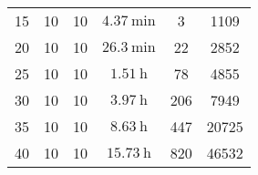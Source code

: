 \documentclass[italian,twoside,twocolumn]{article}
\begin{document}
\begin{table}[htbp]
{\begin{tabular}{c|ccccc}
			15   &      10      &     10     & $ \SI{4.37}{\minute} $ &           3            &    1109     \\
			20   &      10      &     10     & $ \SI{26.3}{\minute} $ &           22           &    2852     \\
			25   &      10      &     10     &  $ \SI{1.51}{\hour} $  &           78           &    4855     \\
			30   &      10      &     10     &  $ \SI{3.97}{\hour} $  &          206           &    7949     \\
			35   &      10      &     10     &  $ \SI{8.63}{\hour} $  &          447           &    20725    \\
			40   &      10      &     10     & $ \SI{15.73}{\hour} $  &          820           &    46532    \\ \hline
		\end{tabular} 
		\label{tab:risultati_xie_kang_10}
	}

\end{table}
\vspace*{-20pt}
\end{document}
